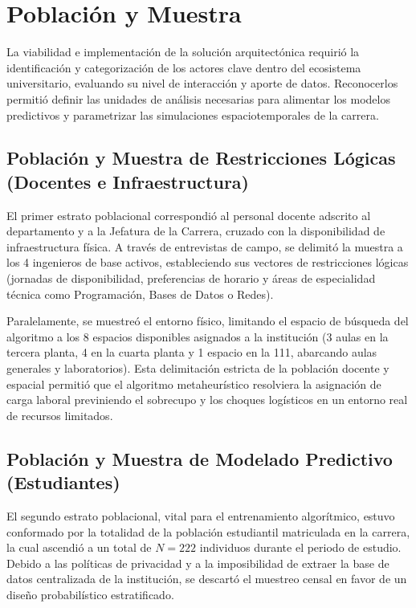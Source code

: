 \section{Población y Muestra}
La viabilidad e implementación de la solución arquitectónica requirió la identificación y categorización de los actores clave dentro del ecosistema universitario, evaluando su nivel de interacción y aporte de datos. Reconocerlos permitió definir las unidades de análisis necesarias para alimentar los modelos predictivos y parametrizar las simulaciones espaciotemporales de la carrera.

\subsection{Población y Muestra de Restricciones Lógicas (Docentes e Infraestructura)}
El primer estrato poblacional correspondió al personal docente adscrito al departamento y a la Jefatura de la Carrera, cruzado con la disponibilidad de infraestructura física. A través de entrevistas de campo, se delimitó la muestra a los 4 ingenieros de base activos, estableciendo sus vectores de restricciones lógicas (jornadas de disponibilidad, preferencias de horario y áreas de especialidad técnica como Programación, Bases de Datos o Redes).

Paralelamente, se muestreó el entorno físico, limitando el espacio de búsqueda del algoritmo a los 8 espacios disponibles asignados a la institución (3 aulas en la tercera planta, 4 en la cuarta planta y 1 espacio en la 111, abarcando aulas generales y laboratorios). Esta delimitación estricta de la población docente y espacial permitió que el algoritmo metaheurístico resolviera la asignación de carga laboral previniendo el sobrecupo y los choques logísticos en un entorno real de recursos limitados.

\subsection{Población y Muestra de Modelado Predictivo (Estudiantes)}
El segundo estrato poblacional, vital para el entrenamiento algorítmico, estuvo conformado por la totalidad de la población estudiantil matriculada en la carrera, la cual ascendió a un total de $N = 222$ individuos durante el periodo de estudio. Debido a las políticas de privacidad y a la imposibilidad de extraer la base de datos centralizada de la institución, se descartó el muestreo censal en favor de un diseño probabilístico estratificado.

